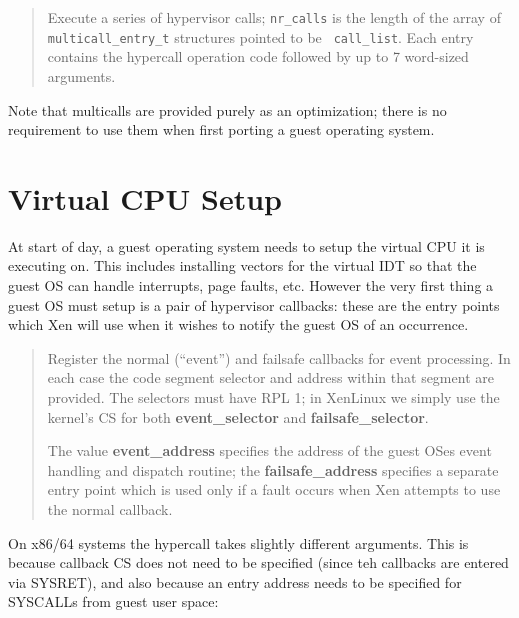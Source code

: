 \documentclass[11pt,twoside,final,openright,a4paper]{report}
\newcommand{\hypercall}[1]{\vspace{2mm}{\sf #1}}
\begin{document}
\begin{quote}
\hypercall{multicall(void *call\_list, int nr\_calls)}

Execute a series of hypervisor calls; {\tt nr\_calls} is the length of
the array of {\tt multicall\_entry\_t} structures pointed to be {\tt
call\_list}. Each entry contains the hypercall operation code followed
by up to 7 word-sized arguments.
\end{quote}

Note that multicalls are provided purely as an optimization; there is
no requirement to use them when first porting a guest operating
system.


\section{Virtual CPU Setup} 

At start of day, a guest operating system needs to setup the virtual
CPU it is executing on. This includes installing vectors for the
virtual IDT so that the guest OS can handle interrupts, page faults,
etc. However the very first thing a guest OS must setup is a pair 
of hypervisor callbacks: these are the entry points which Xen will
use when it wishes to notify the guest OS of an occurrence. 

\begin{quote}
\hypercall{set\_callbacks(unsigned long event\_selector, unsigned long
  event\_address, unsigned long failsafe\_selector, unsigned long
  failsafe\_address) }

Register the normal (``event'') and failsafe callbacks for 
event processing. In each case the code segment selector and 
address within that segment are provided. The selectors must
have RPL 1; in XenLinux we simply use the kernel's CS for both 
{\bf event\_selector} and {\bf failsafe\_selector}.

The value {\bf event\_address} specifies the address of the guest OSes
event handling and dispatch routine; the {\bf failsafe\_address}
specifies a separate entry point which is used only if a fault occurs
when Xen attempts to use the normal callback. 

\end{quote} 

On x86/64 systems the hypercall takes slightly different
arguments. This is because callback CS does not need to be specified
(since teh callbacks are entered via SYSRET), and also because an
entry address needs to be specified for SYSCALLs from guest user
space:
\end{document}
